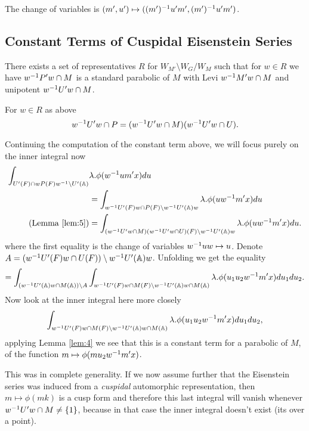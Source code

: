     The change of variables is \((m', u') \mapsto ((m')^{-1} u' m', (m')^{-1} u' m')\).

\subsection{Constant Terms of Cuspidal Eisenstein Series}
\begin{Lemma}\label{lem:4}
        There exists a set of representatives \(R\) for \( W_{M'}\setminus W_G / W_{M} \) such that for \(w\in R\) we have  \(w^{-1} P'w\cap M\) is a standard parabolic of \(M\) with Levi \(w^{-1} M'w\cap M\) and unipotent \(w^{-1} U'w\cap M\).
    \end{Lemma}
    \begin{Lemma}\label{lem:5}
    	For \(w\in R\) as above
        \[w^{-1} U' w \cap P = (w^{-1} U' w \cap M)(w^{-1} U' w \cap U).\]
    \end{Lemma}
    
    Continuing the computation of the constant term above, we will focus purely on the inner integral now
    \begin{equation*}
        \begin{aligned}
            \int_{U'(F)\cap wP(F)w\inv \setminus U'(\A)}& \lambda.\phi( w\inv um' x)  du \\&= \int_{w\inv U'(F)w \cap P(F) \setminus w\inv U'(\A)w} \lambda.\phi( uw\inv m' x)  du \\
            (\text{Lemma \ref{lem:5}})&= \int_{(w\inv U' w \cap M)(w\inv U' w \cap U)(F) \setminus w\inv U'(\A)w} \lambda.\phi( uw\inv m' x)  du . \\
        \end{aligned}
    \end{equation*}
    where the first equality is the change of variables \(w^{-1} u w\mapsto u \). Denote \(A = (w\inv U'(F) w \cap U(F) ) \setminus w\inv U'(\A)w \). Unfolding we get the equality
    \[= \int_{(w\inv U'(\A)w \cap M(\A)) \setminus A} \int_{w\inv U'(F) w \cap M(F) \setminus w\inv U'(\A)w \cap M(\A)} \lambda.\phi( u_1 u_2 w\inv m' x)  du_1 du_2.\]
     Now look at the inner integral here more closely 
    \[ \int_{w\inv U'(F) w \cap M(F) \setminus w\inv U'(\A)w \cap M(\A)}\lambda. \phi( u_1 u_2 w\inv m' x)  du_1 du_2,\]
    applying Lemma \ref{lem:4} we see that this is a constant term for a parabolic of \(M\), of the function \(m\mapsto \phi(m u_2 w\inv m' x)\). 
\begin{comment}
	    \begin{Lemma}
        \(u_2 w\inv m' x \in K\) with variables as above.
    \end{Lemma}
\end{comment}
    This was in complete generality. If we now assume further that the Eisenstein series was induced from a \textit{cuspidal} automorphic representation, then \(m\mapsto \phi(mk)\) is a cusp form and therefore this last integral will vanish whenever \(w^{-1} U'w \cap M \neq \{1\}\), because in that case the inner integral doesn't exist (its over a point).

